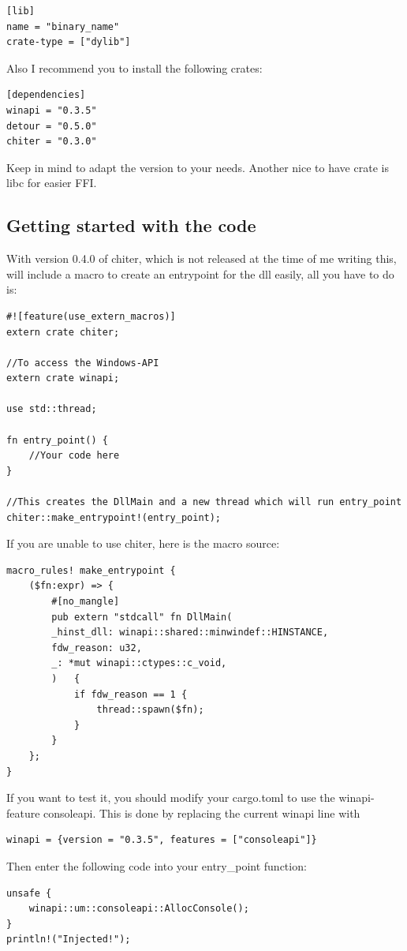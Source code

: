\documentclass[]{scrartcl}
\begin{document}
\begin{verbatim}
[lib]
name = "binary_name"
crate-type = ["dylib"]
\end{verbatim}
\noindent
Also I recommend you to install the following crates:

\begin{verbatim}
[dependencies]
winapi = "0.3.5"
detour = "0.5.0"
chiter = "0.3.0"
\end{verbatim}
\noindent
Keep in mind to adapt the version to your needs. Another nice to have crate is libc for easier FFI.
\newpage
\subsection{Getting started with the code}

With version 0.4.0 of chiter, which is not released at the time of me writing this, will include a macro to create an entrypoint for the dll easily, all you have to do is:

\begin{verbatim}
#![feature(use_extern_macros)]
extern crate chiter;

//To access the Windows-API
extern crate winapi;

use std::thread;

fn entry_point() {
	//Your code here
}

//This creates the DllMain and a new thread which will run entry_point
chiter::make_entrypoint!(entry_point);
\end{verbatim}

\noindent
If you are unable to use chiter, here is the macro source:

\begin{verbatim}
macro_rules! make_entrypoint {
	($fn:expr) => {
		#[no_mangle]
		pub extern "stdcall" fn DllMain(
		_hinst_dll: winapi::shared::minwindef::HINSTANCE,
		fdw_reason: u32,
		_: *mut winapi::ctypes::c_void,
		)	{
			if fdw_reason == 1 {
				thread::spawn($fn);
			}
		}
	};
}
\end{verbatim}
\noindent
If you want to test it, you should modify your cargo.toml to use the winapi-feature consoleapi. This is done by replacing the current winapi line with

\begin{verbatim}
winapi = {version = "0.3.5", features = ["consoleapi"]}
\end{verbatim}
\noindent
Then enter the following code into your entry\_point function:
\newline
\begin{verbatim}
unsafe {
	winapi::um::consoleapi::AllocConsole();
}
println!("Injected!");
\end{verbatim}
\end{document}
